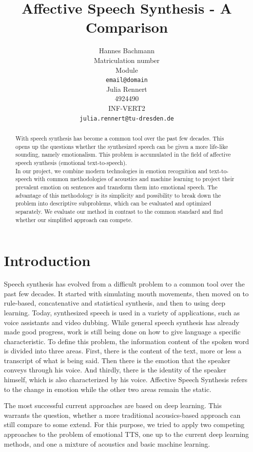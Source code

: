 \documentclass[11pt]{article}
\title{Affective Speech Synthesis - A Comparison}
\author{Hannes Bachmann\\
  Matriculation number\\
  Module \\
  \texttt{email@domain} 
  \\\And
  Julia Rennert \\
  4924490\\
  INF-VERT2 \\
  \texttt{julia.rennert@tu-dresden.de}
  }
\begin{document}
\maketitle
\begin{abstract}
With speech synthesis has become a common tool over the past few decades. This opens up the questions whether the synthesized speech can be given a more life-like sounding, namely emotionalism. This problem is accumulated in the field of affective speech synthesis (emotional text-to-speech). \\
In our project, we combine modern technologies in emotion recognition and text-to-speech with common methodologies of acoustics and machine learning to project their prevalent emotion on sentences and transform them into emotional speech. The advantage of this methodology is its simplicity and possibility to break down the problem into descriptive subproblems, which can be evaluated and optimized separately. We evaluate our method in contrast to the common standard and find whether our simplified approach can compete.
\end{abstract}

\section{Introduction}
Speech synthesis has evolved from a difficult problem to a common tool over the past few decades.
It started with simulating mouth movements, then moved on to rule-based, concatenative and
statistical synthesis, and then to using deep learning. Today, synthesized speech is used in a
variety of applications, such as voice assistants and video dubbing.
While general speech synthesis has already made good progress, work is still being done on
how to give language a specific characteristic. To define this problem, the information content of
the spoken word is divided into three areas. First, there is the content of the text, more or less
a transcript of what is being said. Then there is the emotion that the speaker conveys through
his voice. And thirdly, there is the identity of the speaker himself, which is also characterized by
his voice. Affective Speech Synthesis refers to the change in emotion while the other two areas remain the static.

The most successful current approaches are based on deep learning\cite{triantafyllopoulos_overview_2023, cho_multi-speaker_2021, diatlova_emospeech_2023}. This warrants the question, whether a more traditional acousics-based approach can still compare to some extend. For this purpose, we tried to apply two competing approaches to the problem of emotional TTS, one up to the current deep learning methods, and one a mixture of acoustics and basic machine learning. 
\end{document}
